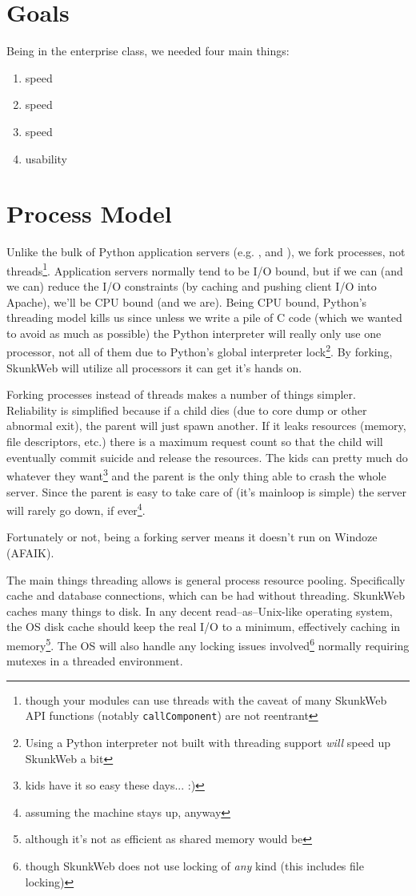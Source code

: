 \documentclass[twocolumn]{article}
\begin{document}
\section{Goals}
Being in the enterprise class, we needed four main things:
\begin{enumerate}
\item speed
\item speed
\item speed
\item usability
\end{enumerate}

\section{Process Model}
Unlike the bulk of Python application servers (e.g. \cite{zope}, \cite{webware} and
\cite{pywx}), we fork processes, not threads\footnote{though your
modules can use threads with the caveat of many SkunkWeb API
functions (notably \texttt{callComponent}) are not reentrant}.
Application servers normally tend to be I/O bound, but if we can (and
we can) reduce the I/O constraints (by caching and pushing client I/O
into Apache), we'll be CPU bound (and we are).  Being CPU bound,
Python's threading model kills us since unless we write a pile of C
code (which we wanted to avoid as much as possible) the Python
interpreter will really only use one processor, not all of them due to
Python's global interpreter lock\footnote{Using a Python interpreter
not built with threading support \emph{will} speed up SkunkWeb
a bit}.  By forking, SkunkWeb will utilize all processors it can get
it's hands on.

Forking processes instead of threads makes a number of things simpler.
Reliability is simplified because if a child dies (due to core dump or
other abnormal exit), the parent will just spawn another.  If it leaks
resources (memory, file descriptors, etc.) there is a maximum request
count so that the child will eventually commit suicide and release the
resources.  The kids can pretty much do whatever they
want\footnote{kids have it so easy these days... :)} and the parent is
the only thing able to crash the whole server.  Since the parent is
easy to take care of (it's mainloop is simple) the server will rarely
go down, if ever\footnote{assuming the machine stays up, anyway}.

Fortunately or not, being a forking server means it doesn't run on
Windoze (AFAIK).  

The main things threading allows is general process resource pooling.
Specifically cache and database connections, which can be had without
threading.  SkunkWeb caches many things to disk. In any decent
read--as--Unix-like operating system, the OS disk cache should keep
the real I/O to a minimum, effectively caching in
memory\footnote{although it's not as efficient as shared memory would
be}.  The OS will also handle any locking issues
involved\footnote{though SkunkWeb does not use locking of \emph{any}
kind (this includes file locking)} normally requiring mutexes in a
threaded environment.
\end{document}
